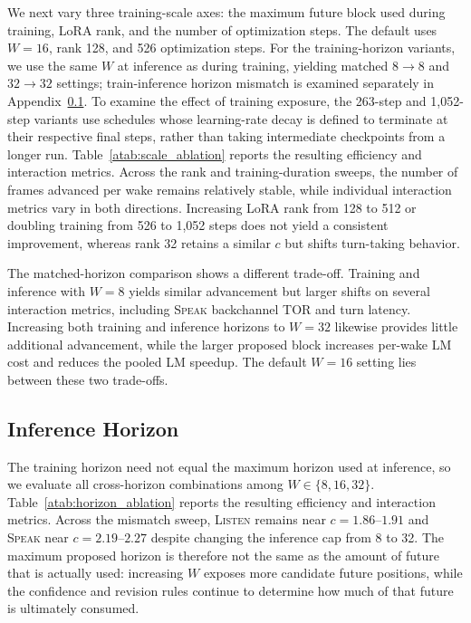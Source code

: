 We next vary three training-scale axes: the maximum future block used during training, LoRA rank, and the number of optimization steps.
The default uses $W=16$, rank 128, and 526 optimization steps.
For the training-horizon variants, we use the same $W$ at inference as during training, yielding matched $8\!\rightarrow\!8$ and $32\!\rightarrow\!32$ settings; train-inference horizon mismatch is examined separately in Appendix~\ref{asubsec:inference_horizon}.
To examine the effect of training exposure, the 263-step and 1,052-step variants use schedules whose learning-rate decay is defined to terminate at their respective final steps, rather than taking intermediate checkpoints from a longer run.
Table~\ref{atab:scale_ablation} reports the resulting efficiency and interaction metrics.
Across the rank and training-duration sweeps, the number of frames advanced per wake remains relatively stable, while individual interaction metrics vary in both directions.
Increasing LoRA rank from 128 to 512 or doubling training from 526 to 1,052 steps does not yield a consistent improvement, whereas rank 32 retains a similar $c$ but shifts turn-taking behavior.

The matched-horizon comparison shows a different trade-off.
Training and inference with $W=8$ yields similar advancement but larger shifts on several interaction metrics, including \textsc{Speak} backchannel TOR and turn latency.
Increasing both training and inference horizons to $W=32$ likewise provides little additional advancement, while the larger proposed block increases per-wake LM cost and reduces the pooled LM speedup.
The default $W=16$ setting lies between these two trade-offs.



\subsection{Inference Horizon}
\label{asubsec:inference_horizon}

The training horizon need not equal the maximum horizon used at inference, so we evaluate all cross-horizon combinations among $W\in\{8,16,32\}$.
Table~\ref{atab:horizon_ablation} reports the resulting efficiency and interaction metrics.
Across the mismatch sweep, \textsc{Listen} remains near $c=1.86$--$1.91$ and \textsc{Speak} near $c=2.19$--$2.27$ despite changing the inference cap from 8 to 32.
The maximum proposed horizon is therefore not the same as the amount of future that is actually used: increasing $W$ exposes more candidate future positions, while the confidence and revision rules continue to determine how much of that future is ultimately consumed.

